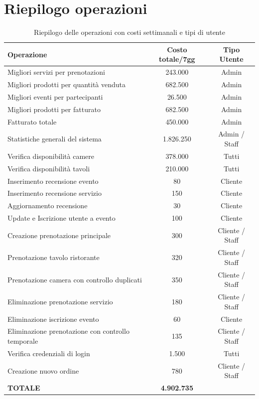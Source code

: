 \documentclass[a4paper,12pt]{report}
\begin{document}
\section{Riepilogo operazioni}
\begin{table}[H]
  \centering
  \small
  \renewcommand{\arraystretch}{1.2}
  \begin{tabularx}{\textwidth}{|>{\raggedright\arraybackslash}X|c|c|}
    \hline
    \rowcolor{gray!20}
    \textbf{Operazione} & \textbf{Costo totale/7gg} & \textbf{Tipo Utente} \\
    \hline
    Migliori servizi per prenotazioni & 243.000 & Admin \\
    \hline
    Migliori prodotti per quantità venduta & 682.500 & Admin \\
    \hline
    Migliori eventi per partecipanti & 26.500 & Admin \\
    \hline
    Migliori prodotti per fatturato & 682.500 & Admin \\
    \hline
    Fatturato totale & 450.000 & Admin \\
    \hline
    Statistiche generali del sistema & 1.826.250 & Admin / Staff \\
    \hline
    Verifica disponibilità camere & 378.000 & Tutti \\
    \hline
    Verifica disponibilità tavoli & 210.000 & Tutti \\
    \hline
    Inserimento recensione evento & 80 & Cliente \\
    \hline
    Inserimento recensione servizio & 150 & Cliente \\
    \hline
    Aggiornamento recensione & 30 & Cliente \\
    \hline
    Update e Iscrizione utente a evento & 100 & Cliente \\
    \hline
    Creazione prenotazione principale & 300 & Cliente / Staff \\
    \hline
    Prenotazione tavolo ristorante & 320 & Cliente / Staff \\
    \hline
    Prenotazione camera con controllo duplicati & 350 & Cliente / Staff \\
    \hline
    Eliminazione prenotazione servizio & 180 & Cliente / Staff \\
    \hline
    Eliminazione iscrizione evento & 60 & Cliente \\
    \hline
    Eliminazione prenotazione con controllo temporale & 135 & Cliente / Staff \\
    \hline
    Verifica credenziali di login & 1.500 & Tutti \\
    \hline
    Creazione nuovo ordine & 780 & Cliente / Staff \\
    \hline
    \rowcolor{gray!20}
    \textbf{TOTALE} & \textbf{4.902.735} & \\
    \hline
  \end{tabularx}
  \caption{Riepilogo delle operazioni con costi settimanali e tipi di utente}
  \label{tab:riepilogo-operazioni}
\end{table}
\end{document}
